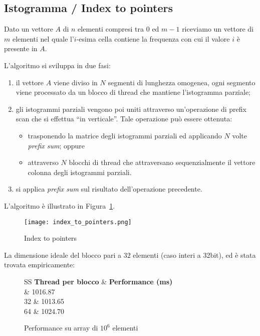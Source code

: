 \subsection{Istogramma / Index to pointers}
\label{idx-to-pnt}
Dato un vettore $A$ di $n$ elementi compresi tra $0$ ed $m-1$ riceviamo un vettore di $m$ elementi nel quale l'$i$-esima cella contiene la frequenza con cui il valore $i$ è presente in $A$. 

L'algoritmo si sviluppa in due fasi:
\begin{enumerate}
    \item il vettore $A$ viene diviso in $N$ segmenti di lunghezza omogenea, ogni segmento viene processato da un blocco di thread che mantiene l'istogramma parziale;
    \item gli istogrammi parziali vengono poi uniti attraverso un'operazione di prefix scan che si effettua ``in verticale''. Tale operazione può essere ottenuta:
    \begin{itemize}
        \item trasponendo la matrice degli istogrammi parziali ed applicando $N$ volte \emph{prefix sum}; oppure
        \item attraverso $N$ blocchi di thread che attraversano sequenzialmente il vettore colonna degli istogrammi parziali.
    \end{itemize}
    \item si applica \emph{prefix sum} sul risultato dell'operazione precedente.
\end{enumerate}

L'algoritmo è illustrato in Figura~\ref{index_to_pointers}. 

\begin{figure}[t]
    \centering
	\texttt{[image: index\_to\_pointers.png]}
	\caption{Index to pointers}
	\label{index_to_pointers}
\end{figure}


La dimensione ideale del blocco pari a $32$ elementi (caso interi a 32bit), ed è stata trovata empiricamente:
\begin{figure}[H]
	\centering
	\begin{tabular}{SS}
		\toprule
		\textbf{Thread per blocco} & \textbf{Performance (\si{\milli\second})} \\  & 1016.87 \\
		32 & 1013.65 \\
		64 & 1024.70 \\ \bottomrule
	\end{tabular}
	\caption{Performance su array di $10^6$ elementi} %
\end{figure}

